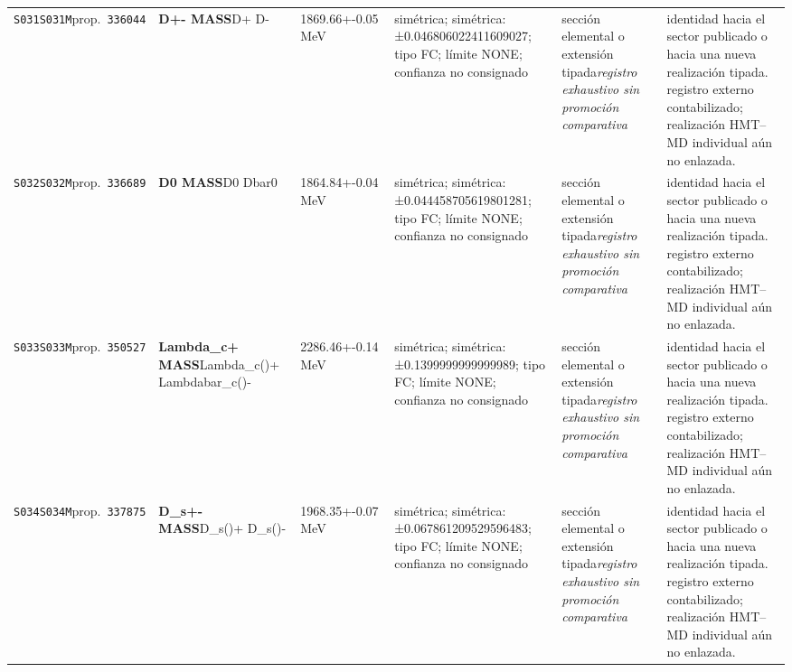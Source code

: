 \begin{landscape}
\begin{longtable}{L{1.85cm}L{4.45cm}L{2.35cm}L{4.05cm}L{3.35cm}L{7.15cm}}
\texttt{S031}\newline \texttt{S031M}\newline prop.\ \texttt{336044} & \textbf{D+- MASS}\newline D+ \textbar{}\allowbreak{} D- & 1869.66+-0.05\,MeV & simétrica; simétrica: ±0.046806022411609027; tipo FC; límite NONE; confianza no consignado & sección elemental o extensión tipada\newline \emph{registro exhaustivo sin promoción comparativa} & identidad hacia el sector publicado o hacia una nueva realización tipada. registro externo contabilizado; realización HMT--MD individual aún no enlazada. \\
\texttt{S032}\newline \texttt{S032M}\newline prop.\ \texttt{336689} & \textbf{D0 MASS}\newline D0 \textbar{}\allowbreak{} Dbar0 & 1864.84+-0.04\,MeV & simétrica; simétrica: ±0.044458705619801281; tipo FC; límite NONE; confianza no consignado & sección elemental o extensión tipada\newline \emph{registro exhaustivo sin promoción comparativa} & identidad hacia el sector publicado o hacia una nueva realización tipada. registro externo contabilizado; realización HMT--MD individual aún no enlazada. \\
\texttt{S033}\newline \texttt{S033M}\newline prop.\ \texttt{350527} & \textbf{Lambda\_\allowbreak{}c+ MASS}\newline Lambda\_\allowbreak{}c()+ \textbar{}\allowbreak{} Lambdabar\_\allowbreak{}c()- & 2286.46+-0.14\,MeV & simétrica; simétrica: ±0.1399999999999989; tipo FC; límite NONE; confianza no consignado & sección elemental o extensión tipada\newline \emph{registro exhaustivo sin promoción comparativa} & identidad hacia el sector publicado o hacia una nueva realización tipada. registro externo contabilizado; realización HMT--MD individual aún no enlazada. \\
\texttt{S034}\newline \texttt{S034M}\newline prop.\ \texttt{337875} & \textbf{D\_\allowbreak{}s+- MASS}\newline D\_\allowbreak{}s()+ \textbar{}\allowbreak{} D\_\allowbreak{}s()- & 1968.35+-0.07\,MeV & simétrica; simétrica: ±0.067861209529596483; tipo FC; límite NONE; confianza no consignado & sección elemental o extensión tipada\newline \emph{registro exhaustivo sin promoción comparativa} & identidad hacia el sector publicado o hacia una nueva realización tipada. registro externo contabilizado; realización HMT--MD individual aún no enlazada. \\

\end{longtable}
\end{landscape}
